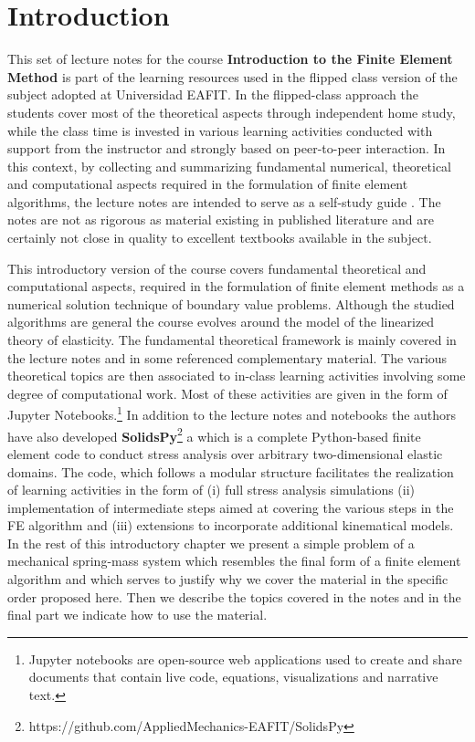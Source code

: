 \graphicspath{ {./img/intro/} }

\chapter{Introduction}

This set of lecture notes for the course {\bf Introduction to the Finite Element Method} is part of the learning resources used in the flipped class version of the subject adopted at Universidad EAFIT. In the flipped-class approach the students cover most of the theoretical aspects through independent home study, while the class time is invested in various learning activities conducted with support from the instructor and strongly based on peer-to-peer interaction. In this context, by collecting and summarizing fundamental numerical, theoretical and computational aspects required in the formulation of finite element algorithms, the lecture notes are intended to serve as a self-study guide . The notes are not as rigorous as material existing in published literature and are certainly not close in quality to excellent textbooks available in the subject. 

This introductory version of the course covers fundamental theoretical and computational aspects, required in the formulation of finite element methods as a numerical solution technique of boundary value problems. Although the studied algorithms are general the course evolves around the model of the linearized theory of elasticity. The fundamental theoretical framework is mainly covered in the lecture notes and in some referenced complementary material. The various theoretical topics are then associated to in-class learning activities involving some degree of computational work. Most of these activities are given in the form of Jupyter Notebooks.\footnote{Jupyter notebooks are open-source web applications used to create and share documents that contain live code, equations, visualizations and narrative text.}  In addition to the lecture notes and notebooks the authors have also developed {\bf SolidsPy}\footnote{https://github.com/AppliedMechanics-EAFIT/SolidsPy} a which is a complete Python-based finite element code to conduct stress analysis over arbitrary two-dimensional elastic domains. The code, which follows a modular structure facilitates the realization of learning activities in the form of (i) full stress analysis simulations (ii) implementation of intermediate steps aimed at covering the various steps in the FE algorithm and (iii) extensions to incorporate additional kinematical models. In the rest of this introductory chapter we present a simple problem of a mechanical spring-mass system which resembles the final form of a finite element algorithm and which serves to justify why we cover the material in the specific order proposed  here. Then we describe the topics covered in the notes and in the final part we indicate how to use the material.

